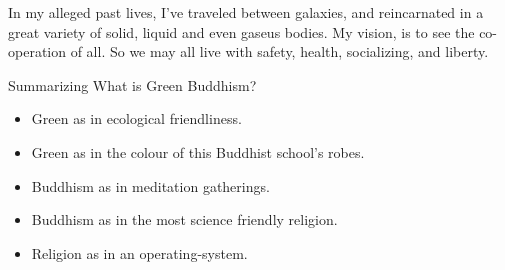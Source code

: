 In my alleged past lives, I've traveled between galaxies, and reincarnated in a
great variety of solid, liquid and even gaseus bodies. My vision, is to see the
co-operation of all. So we may all live with safety, health, socializing, and
liberty. 

Summarizing What is Green Buddhism?
\begin{itemize}
  \item Green as in ecological friendliness.
  \item Green as in the colour of this Buddhist school's robes. 
  \item Buddhism as in meditation gatherings. 
  \item Buddhism as in the most science friendly
religion\cite{kalamas}\cite{singleAtom}. 
  \item Religion as in an operating-system.
\end{itemize}
